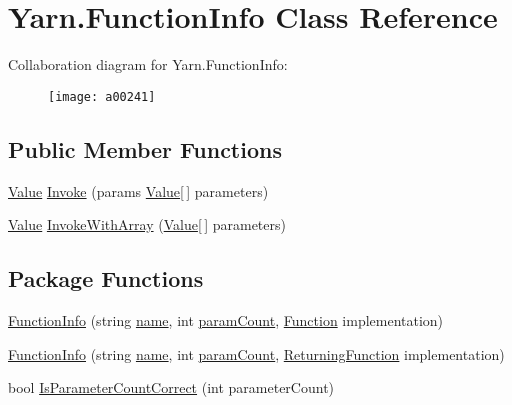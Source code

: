 \hypertarget{a00041}{\section{Yarn.\-Function\-Info Class Reference}
\label{a00041}
}


Collaboration diagram for Yarn.\-Function\-Info\-:
\nopagebreak
\begin{figure}[H]
\begin{center}
\leavevmode
\texttt{[image: a00241]}
\end{center}
\end{figure}
\subsection*{Public Member Functions}
\begin{DoxyCompactItemize}
\item 
\hyperlink{a00086}{Value} \hyperlink{a00041_ab400ac66785d7df2e3fc0f3ce3796044}{Invoke} (params \hyperlink{a00086}{Value}\mbox{[}$\,$\mbox{]} parameters)
\item 
\hyperlink{a00086}{Value} \hyperlink{a00041_a3ce11058d35232907a738de4bb094c67}{Invoke\-With\-Array} (\hyperlink{a00086}{Value}\mbox{[}$\,$\mbox{]} parameters)
\end{DoxyCompactItemize}
\subsection*{Package Functions}
\begin{DoxyCompactItemize}
\item 
\hyperlink{a00041_a93457cd0e838cb2ef59cc2a3a46ce758}{Function\-Info} (string \hyperlink{a00041_adb38e83e3c1597b553aeff14bef5bfcb}{name}, int \hyperlink{a00041_aa8527de9e4f153b05164ccaf167c3186}{param\-Count}, \hyperlink{a00026_ae0be2e5cf13d5779816102439e61ff1a}{Function} implementation)
\item 
\hyperlink{a00041_a41d97c09da25caede70cb734d18113b9}{Function\-Info} (string \hyperlink{a00041_adb38e83e3c1597b553aeff14bef5bfcb}{name}, int \hyperlink{a00041_aa8527de9e4f153b05164ccaf167c3186}{param\-Count}, \hyperlink{a00026_a5177bf74fbfe7303fac9d8236c2e514b}{Returning\-Function} implementation)
\item 
bool \hyperlink{a00041_a1ed09ff8aafa230a0d2bbc23cd6cd763}{Is\-Parameter\-Count\-Correct} (int parameter\-Count)
\end{DoxyCompactItemize}
